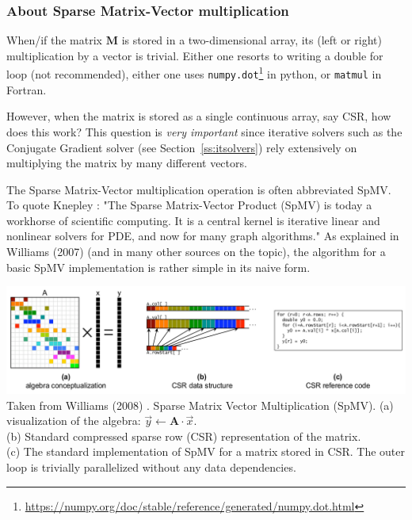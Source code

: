 \subsubsection{About Sparse Matrix-Vector multiplication} \label{ss:spmv}
 

When/if the matrix ${\bm M}$ is stored in a two-dimensional array, 
its (left or right) multiplication by a vector is trivial. 
Either one resorts to writing a double for loop (not recommended), 
either one uses {\tt numpy.dot}\footnote{\url{https://numpy.org/doc/stable/reference/generated/numpy.dot.html}}
in python, or {\tt matmul} in Fortran.

However, when the matrix is stored as a single continuous array, say CSR, how does this work?
This question is {\it very important} since iterative solvers such as the Conjugate Gradient solver
(see Section~\ref{ss:itsolvers}) rely extensively on multiplying the matrix by many different vectors. 

The Sparse Matrix-Vector multiplication operation is often abbreviated SpMV.
To quote Knepley \cite{knepley}: "The Sparse Matrix-Vector Product (SpMV) is today 
a workhorse of scientific computing. It is a central kernel is iterative linear and 
nonlinear solvers for PDE, and now for many graph algorithms."
As explained in Williams \etal (2007) \cite{wiov07} (and in many 
other sources on the topic), the algorithm for 
a basic SpMV implementation is rather simple in its naive form. 

\begin{center}
\includegraphics[width=17cm]{images/spmv/widc08}\\
{\captionfont Taken from Williams \etal (2008) \cite{widc08}. 
Sparse Matrix Vector Multiplication (SpMV). 
(a) visualization of the algebra: $\vec{y} \leftarrow {\bm A}\cdot \vec{x}$.\\
(b) Standard compressed sparse row (CSR) representation of the matrix.  \\
(c) The standard implementation of SpMV for a matrix stored in CSR. 
The outer loop is trivially parallelized without any data dependencies.}
\end{center}

